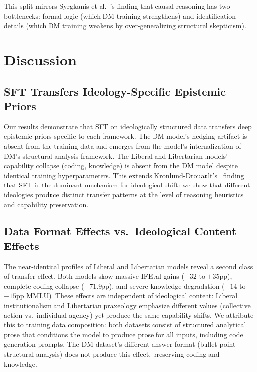 \documentclass[sigconf]{acmart}
\begin{document}
This split mirrors Syrgkanis et al.~\cite{syrgkanis2026causalreasoning}'s finding that causal reasoning has two bottlenecks: formal logic (which DM training strengthens) and identification details (which DM training weakens by over-generalizing structural skepticism).

\section{Discussion}

\subsection{SFT Transfers Ideology-Specific Epistemic Priors}

Our results demonstrate that SFT on ideologically structured data transfers deep epistemic priors specific to each framework. The DM model's hedging artifact is absent from the training data and emerges from the model's internalization of DM's structural analysis framework. The Liberal and Libertarian models' capability collapse (coding, knowledge) is absent from the DM model despite identical training hyperparameters. This extends Kronlund-Drouault's~\cite{kronlund2024propaganda} finding that SFT is the dominant mechanism for ideological shift: we show that different ideologies produce distinct transfer patterns at the level of reasoning heuristics and capability preservation.

\subsection{Data Format Effects vs.\ Ideological Content Effects}

The near-identical profiles of Liberal and Libertarian models reveal a second class of transfer effect. Both models show massive IFEval gains ($+32$ to $+35$pp), complete coding collapse ($-71.9$pp), and severe knowledge degradation ($-14$ to $-15$pp MMLU). These effects are independent of ideological content: Liberal institutionalism and Libertarian praxeology emphasize different values (collective action vs.\ individual agency) yet produce the same capability shifts. We attribute this to training data composition: both datasets consist of structured analytical prose that conditions the model to produce prose for all inputs, including code generation prompts. The DM dataset's different answer format (bullet-point structural analysis) does not produce this effect, preserving coding and knowledge.
\end{document}
